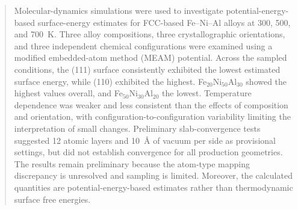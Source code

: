 \documentclass[10pt,twocolumn,a4paper]{article}
\begin{document}
\twocolumn[
\begin{center}
\vspace*{-0.8cm}
{\Large\bfseries Surface Energies of Fe--Ni--Al Alloys\par}
\vspace{0.25cm}
{\normalsize Arham Aneeq \quad Prince Ranga \quad Mayank Labde\par}
\vspace{0.15cm}
{\small MM309N -- Computational Methods for Materials\\
Department of Metallurgical Engineering and Materials Science, IIT Indore\par}
\vspace{0.3cm}
\end{center}
]
\begin{abstract}
Molecular-dynamics simulations were used to investigate potential-energy-based surface-energy estimates for FCC-based Fe--Ni--Al alloys at 300, 500, and 700~K. Three alloy compositions, three crystallographic orientations, and three independent chemical configurations were examined using a modified embedded-atom method (MEAM) potential. Across the sampled conditions, the (111) surface consistently exhibited the lowest estimated surface energy, while (110) exhibited the highest. Fe$_{20}$Ni$_{50}$Al$_{30}$ showed the highest values overall, and Fe$_{50}$Ni$_{30}$Al$_{20}$ the lowest. Temperature dependence was weaker and less consistent than the effects of composition and orientation, with configuration-to-configuration variability limiting the interpretation of small changes. Preliminary slab-convergence tests suggested 12 atomic layers and 10~\AA{} of vacuum per side as provisional settings, but did not establish convergence for all production geometries. The results remain preliminary because the atom-type mapping discrepancy is unresolved and sampling is limited. Moreover, the calculated quantities are potential-energy-based estimates rather than thermodynamic surface free energies.
\end{abstract}







\balance


\end{document}
